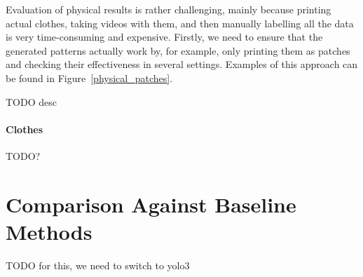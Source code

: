 Evaluation of physical results is rather challenging, mainly because printing actual clothes, taking videos with them, and then manually labelling all the data is very time-consuming and expensive.
Firstly, we need to ensure that the generated patterns actually work by, for example, only printing them as patches and checking their effectiveness in several settings. 
Examples of this approach can be found in Figure~\ref{physical_patches}.

TODO desc

\paragraph{Clothes}

TODO?

\section{Comparison Against Baseline Methods}

TODO for this, we need to switch to yolo3 





